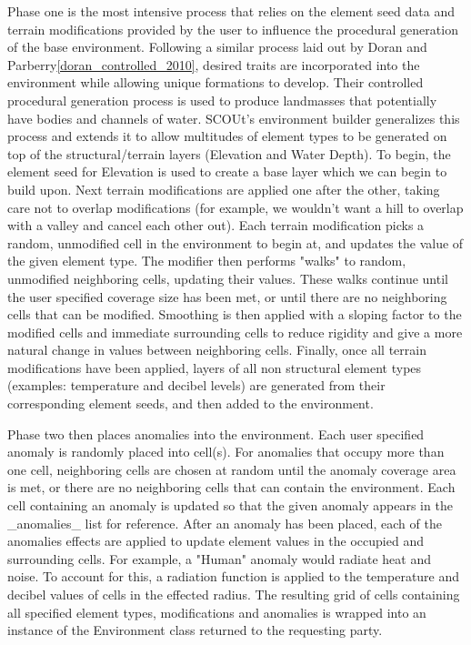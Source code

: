Phase one is the most intensive process that relies on the element seed data and terrain modifications provided by the user to influence the procedural generation of the base environment.
Following a similar process laid out by Doran and Parberry\ref{doran_controlled_2010}, desired traits are incorporated into the environment while allowing unique formations to develop.
Their controlled procedural generation process is used to produce landmasses that potentially have bodies and channels of water.
SCOUt's environment builder generalizes this process and extends it to allow multitudes of element types to be generated on top of the structural/terrain layers (Elevation and Water Depth).
To begin, the element seed for Elevation is used to create a base layer which we can begin to build upon.
Next terrain modifications are applied one after the other, taking care not to overlap modifications (for example, we wouldn't want a hill to overlap with a valley and cancel each other out).
Each terrain modification picks a random, unmodified cell in the environment to begin at, and updates the value of the given element type.
The modifier then performs "walks" to random, unmodified neighboring cells, updating their values.
These walks continue until the user specified coverage size has been met, or until there are no neighboring cells that can be modified.
Smoothing is then applied with a sloping factor to the modified cells and immediate surrounding cells to reduce rigidity and give a more natural change in values between neighboring cells.
Finally, once all terrain modifications have been applied, layers of all non structural element types (examples: temperature and decibel levels) are generated from their corresponding element seeds, and then added to the environment.

Phase two then places anomalies into the environment.
Each user specified anomaly is randomly placed into cell(s).
For anomalies that occupy more than one cell, neighboring cells are chosen at random until the anomaly coverage area is met, or there are no neighboring cells that can contain the environment.
Each cell containing an anomaly is updated so that the given anomaly appears in the _anomalies_ list for reference.
After an anomaly has been placed, each of the anomalies effects are applied to update element values in the occupied and surrounding cells.
For example, a "Human" anomaly would radiate heat and noise.
To account for this, a radiation function  is applied to the temperature and decibel values of cells in the effected radius.
The resulting grid of cells containing all specified element types, modifications and anomalies is wrapped into an instance of the Environment class returned to the requesting party.



